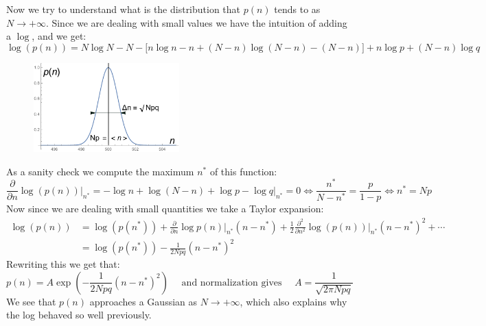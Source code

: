 \documentclass[10pt,a4paper]{book}
\begin{document}
Now we try to understand what is the distribution that $p(n)$ tends to as $N \to +\infty$. Since we are dealing with small values we have the intuition of adding a $\log$, and we get:
\[
\log(p(n)) = N\log N - N - \Big[ n\log n - n + (N-n)\log(N-n) - (N-n) \Big] + n\log p + (N-n)\log q
\]
\begin{figure}[h]
  \begin{center}
    \includegraphics[width=0.5\textwidth]{graphs/gaussEex}
  \end{center}
\end{figure}

As a sanity check we compute the maximum $n^*$ of this function:
\[
\frac{\partial }{\partial n} \log(p(n)) \Bigg|_{n^*} = -\log n + \log(N-n) + \log p - \log q \Bigg|_{n^*} = 0 \Leftrightarrow \frac{n^*}{N - n^*} = \frac{p}{1 - p} \Leftrightarrow n^* = Np
\]
Now since we are dealing with small quantities we take a Taylor expansion:
\begin{align*}
\log(p(n)) &= \log(p(n^*)) + \frac{\partial}{\partial n}\log p(n) \Bigg|_{n^*}(n - n^*) + \frac{1}{2}\frac{\partial^2}{\partial n^2} \log(p(n)) \Bigg|_{n^*} (n - n^*)^2 + \cdots\\
&= \log(p(n^*)) - \frac{1}{2 N p q}(n - n^*)^2
\end{align*}
Rewriting this we get that:
\[
p(n) = A\exp\left(-\frac{1}{2Npq}\left(n - n^*\right)^2\right) \quad \text{ and normalization gives } \quad A = \frac{1}{\sqrt{2\pi N p q}}
\]
We see that $p(n)$ approaches a Gaussian as $N \to +\infty$, which also explains why the log behaved so well previously.
\end{document}
